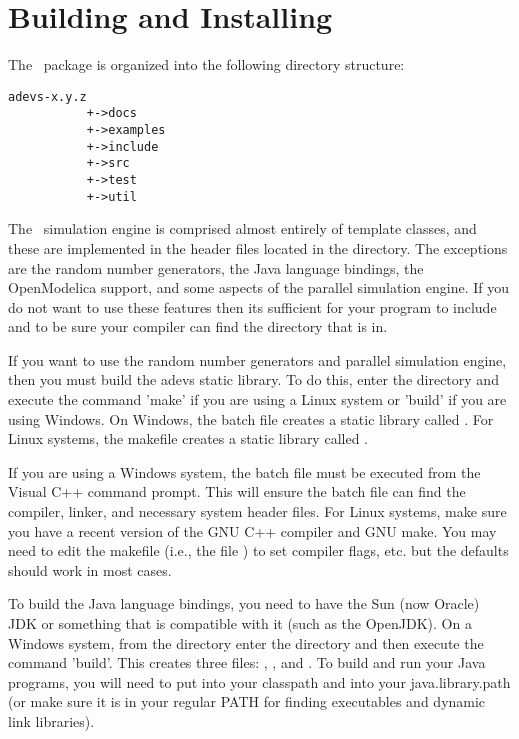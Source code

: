 \chapter{Building and Installing}
The \adevs\ package is organized into the following directory structure:
\begin{verbatim}
adevs-x.y.z
           +->docs
           +->examples
           +->include
           +->src
           +->test
           +->util
\end{verbatim}
The \adevs\ simulation engine is comprised almost entirely of template classes, and these are implemented in the header files located in the  directory. The exceptions are the random number generators, the Java language bindings, the OpenModelica support, and some aspects of the parallel simulation engine. If you do not want to use these features then its sufficient for your program to include  and to be sure your compiler can find the  directory that  is in. 

If you want to use the random number generators and parallel simulation engine, then you must build the adevs static library. To do this, enter the  directory and execute the command 'make' if you are using a Linux system or 'build' if you are using Windows. On Windows, the batch file creates a static library called . For Linux systems, the makefile creates a static library called .

If you are using a Windows system, the batch file must be executed from the Visual C++ command prompt. This will ensure the batch file can find the compiler, linker, and necessary system header files. For Linux systems, make sure you have a recent version of the GNU C++ compiler and GNU make. You may need to edit the makefile (i.e., the file ) to set compiler flags, etc. but the defaults should work in most cases.

To build the Java language bindings, you need to have the Sun (now Oracle) JDK or something that is compatible with it (such as the OpenJDK). On a Windows system, from the  directory enter the  directory and then execute the command 'build'. This creates three files: , , and . To build and run your Java programs, you will need to put  into your classpath and  into your java.library.path (or make sure it is in your regular PATH for finding executables and dynamic link libraries).

